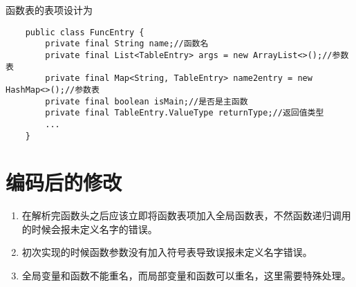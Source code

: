 函数表的表项设计为
\begin{verbatim}
    public class FuncEntry {
        private final String name;//函数名
        private final List<TableEntry> args = new ArrayList<>();//参数表
        private final Map<String, TableEntry> name2entry = new HashMap<>();//参数表
        private final boolean isMain;//是否是主函数
        private final TableEntry.ValueType returnType;//返回值类型
        ...
    }
\end{verbatim}

\section{编码后的修改}

\begin{enumerate}
    \item 在解析完函数头之后应该立即将函数表项加入全局函数表，不然函数递归调用的时候会报未定义名字的错误。
    \item 初次实现的时候函数参数没有加入符号表导致误报未定义名字错误。
    \item 全局变量和函数不能重名，而局部变量和函数可以重名，这里需要特殊处理。
\end{enumerate}